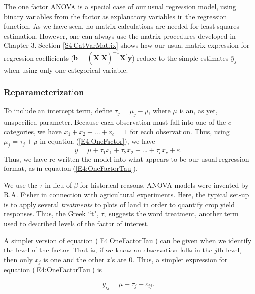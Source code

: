 
The one factor ANOVA is a special case of our usual regression
model, using binary variables from the factor as explanatory
variables in the regression function. As we have seen, no matrix
calculations are needed for least squares estimation. However, one
can always use the matrix procedures developed in Chapter 3. Section
\ref{S4:CatVarMatrix} shows how our usual matrix expression for
regression coefficients ($\mathbf{b} =
\left(\mathbf{X}^{\prime}\mathbf{X}
\right)^{-1}\mathbf{X}^{\prime}\mathbf{y}$) reduce to the simple
estimates $\bar{y}_j$ when using only one categorical variable.

\subsubsection*{Reparameterization}

To include an intercept term, define $\tau_j = \mu_j - \mu $, where
$\mu$ is an, as yet, unspecified parameter. Because each observation
must fall into one of the $c$ categories, we have $x_1+x_2+\ldots
+x_{c}=1$ for each observation. Thus, using $\mu _j = \tau_j + \mu $
in equation (\ref{E4:OneFactor}), we have
\begin{equation}\label{E4:OneFactorTau}
y=\mu +\tau_1x_1+\tau_2x_2+\ldots +\tau_{c}x_{c}+\varepsilon.
\end{equation}
Thus, we have re-written the model into what appears to be our usual
regression format, as in equation (\ref{E4:OneFactorTau}).

We use the $\tau $ in lieu of $\beta $ for historical reasons. ANOVA
models were invented by R.A. Fisher in connection with agricultural
experiments. Here, the typical set-up is to apply several
\textit{treatments} to plots of land in order to quantify crop yield
responses. Thus, the Greek ``t", $\tau ,$ suggests the word
treatment, another term used to described levels of the factor of
interest.

A simpler version of equation (\ref{E4:OneFactorTau}) can be given
when we identify the level of the factor. That is, if we know an
observation falls in the $j$th level, then only $x_j$ is one and the
other $x$'s are 0. Thus, a simpler expression for equation
(\ref{E4:OneFactorTau}) is

\begin{equation*}
y_{ij}=\mu +\tau_j + \varepsilon_{ij}.
\end{equation*}

